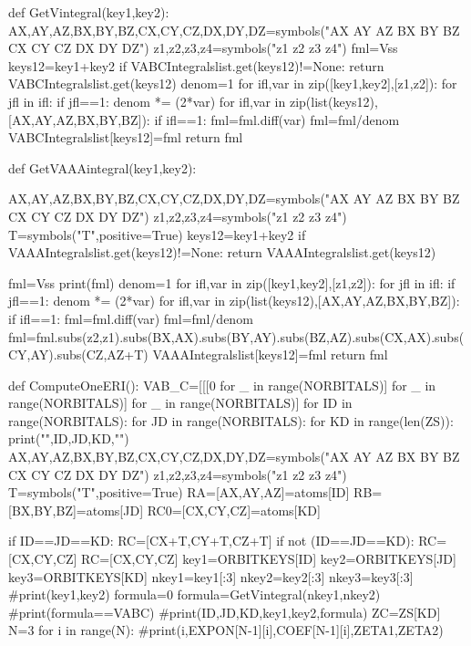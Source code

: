 def GetVintegral(key1,key2):
    AX,AY,AZ,BX,BY,BZ,CX,CY,CZ,DX,DY,DZ=symbols("AX AY AZ BX BY BZ CX CY CZ DX DY DZ")
    z1,z2,z3,z4=symbols("z1 z2 z3 z4")
    fml=Vss
    keys12=key1+key2
    if VABCIntegralslist.get(keys12)!=None:
        return VABCIntegralslist.get(keys12)
    denom=1
    for ifl,var in zip([key1,key2],[z1,z2]):
        for jfl in ifl:
            if jfl==1:
                denom *= (2*var)
    for ifl,var in zip(list(keys12),[AX,AY,AZ,BX,BY,BZ]):
        if ifl==1:
            fml=fml.diff(var)
    fml=fml/denom
    VABCIntegralslist[keys12]=fml
    return fml


def GetVAAAintegral(key1,key2):
    
    AX,AY,AZ,BX,BY,BZ,CX,CY,CZ,DX,DY,DZ=symbols("AX AY AZ BX BY BZ CX CY CZ DX DY DZ")
    z1,z2,z3,z4=symbols("z1 z2 z3 z4")
    T=symbols("T",positive=True)
    keys12=key1+key2
    if VAAAIntegralslist.get(keys12)!=None:
        return VAAAIntegralslist.get(keys12)
 
    fml=Vss
    print(fml)
    denom=1
    for ifl,var in zip([key1,key2],[z1,z2]):
        for jfl in ifl:
            if jfl==1:
                denom *= (2*var)
    for ifl,var in zip(list(keys12),[AX,AY,AZ,BX,BY,BZ]):
        if ifl==1:
            fml=fml.diff(var)
    fml=fml/denom
    fml=fml.subs(z2,z1).subs(BX,AX).subs(BY,AY).subs(BZ,AZ).subs(CX,AX).subs(CY,AY).subs(CZ,AZ+T)
    VAAAIntegralslist[keys12]=fml
    return fml


def ComputeOneERI():
    VAB_C=[[[0 for _ in range(NORBITALS)] for _  in range(NORBITALS)] for _ in range(NORBITALS)]
    for ID in range(NORBITALS):
        for JD in range(NORBITALS):
            for KD in range(len(ZS)):
                    print("\n",ID,JD,KD,"\n")
                    AX,AY,AZ,BX,BY,BZ,CX,CY,CZ,DX,DY,DZ=symbols("AX AY AZ BX BY BZ CX CY CZ DX DY DZ")
                    z1,z2,z3,z4=symbols("z1 z2 z3 z4")
                    T=symbols("T",positive=True)
                    RA=[AX,AY,AZ]=atoms[ID]
                    RB=[BX,BY,BZ]=atoms[JD]
                    RC0=[CX,CY,CZ]=atoms[KD]

                    if ID==JD==KD:
                        RC=[CX+T,CY+T,CZ+T]
                    if not (ID==JD==KD):
                        RC=[CX,CY,CZ]   
                    RC=[CX,CY,CZ]
                    key1=ORBITKEYS[ID]
                    key2=ORBITKEYS[JD]
                    key3=ORBITKEYS[KD]
                    nkey1=key1[:3]
                    nkey2=key2[:3]
                    nkey3=key3[:3]
                    #print(key1,key2)
                    formula=0
                    formula=GetVintegral(nkey1,nkey2)
                    #print(formula==VABC)
                    #print(ID,JD,KD,key1,key2,formula)
                    ZC=ZS[KD]
                    N=3
                    for i in range(N):
                        #print(i,EXPON[N-1][i],COEF[N-1][i],ZETA1,ZETA2)

